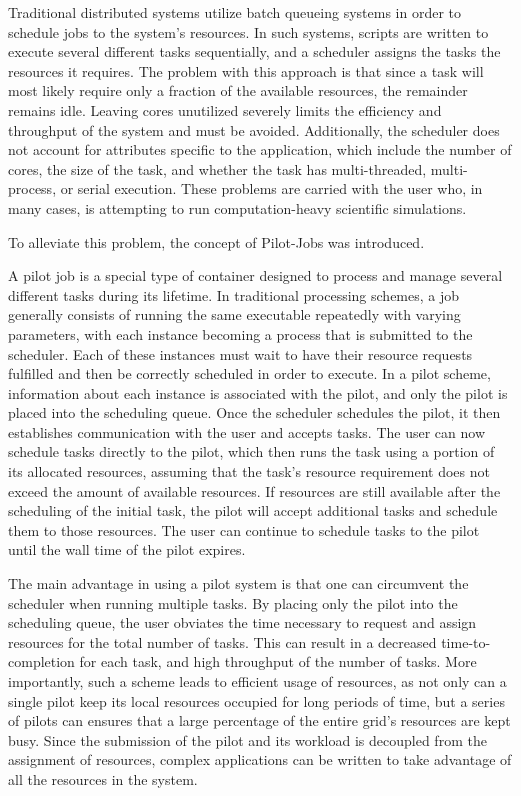 \documentclass[conference]{IEEEtran}
\begin{document}
Traditional distributed systems utilize batch queueing systems in order to schedule jobs to the system's resources. In such systems, scripts are written to execute several different tasks sequentially, and a scheduler assigns the tasks the resources it requires. The problem with this approach is that since a task will most likely require only a fraction of the available resources, the remainder remains idle. Leaving cores unutilized severely limits the efficiency and throughput of the system and must be avoided. Additionally, the scheduler does not account for attributes specific to the application, which include the number of cores, the size of the task, and whether the task has multi-threaded, multi-process, or serial execution. These problems are carried with the user who, in many cases, is attempting to run computation-heavy scientific simulations.




To alleviate this problem, the concept of Pilot-Jobs was introduced. 

A pilot job is a special type of container designed to process and manage several different tasks during its lifetime. In traditional processing schemes, a job generally consists of running the same executable repeatedly with varying parameters, with each instance becoming a process that is submitted to the scheduler. Each of these instances must wait to have their resource requests fulfilled and then be correctly scheduled in order to execute. In a pilot scheme, information about each instance is associated with the pilot, and only the pilot is placed into the scheduling queue. Once the scheduler schedules the pilot, it then establishes communication with the user and accepts tasks. The user can now schedule tasks directly to the pilot, which then runs the task using a portion of its allocated resources, assuming that the task's resource requirement does not exceed the amount of available resources. If resources are still available after the scheduling of the initial task, the pilot will accept additional tasks and schedule them to those resources. The user can continue to schedule tasks to the pilot until the wall time of the pilot expires.

The main advantage in using a pilot system is that one can circumvent the scheduler when running multiple tasks. By placing only the pilot into the scheduling queue, the user obviates the time necessary to request and assign resources for the total number of tasks. This can result in a decreased time-to-completion for each task, and high throughput of the number of tasks. More importantly, such a scheme leads to efficient usage of resources, as not only can a single pilot keep its local resources occupied for long periods of time, but a series of pilots can ensures that a large percentage of the entire grid's resources are kept busy. Since the submission of the pilot and its workload is decoupled from the assignment of resources, complex applications can be written to take advantage of all the resources in the system.
\end{document}
